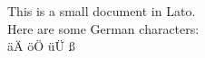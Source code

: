 \documentclass{article}
\begin{document}
This is a small document in Lato.
\\
Here are some German characters:
\\
äÄ öÖ üÜ ß
\end{document}
